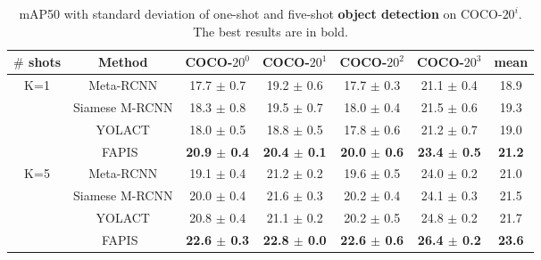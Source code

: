 \documentclass[final]{cvpr}
\def\Approach{FAPIS}
\begin{document}
\begin{table*}[]

\begin{center}
\small
\begin{tabular}{c|c|c|c|c|c|c}
\hline
\hline
\textbf{$\#$ shots} & \textbf{Method}  & \textbf{COCO-$20^0$}      & \textbf{COCO-$20^1$}      & \textbf{COCO-$20^2$ }     & \textbf{COCO-$20^3$}      & mean  \\
\hline
\multirow{4}{*}{K=1} & Meta-RCNN \cite{yanICCV19metarcnn}        & 17.7 $\pm$ 0.7 & 19.2 $\pm$ 0.6 & 17.7 $\pm$ 0.3 & 21.1 $\pm$ 0.4 & 18.9 \\
& Siamese M-RCNN \cite{michaelis2018one} & 18.3 $\pm$ 0.8 & 19.5 $\pm$ 0.7 & 18.0 $\pm$ 0.4 & 21.5 $\pm$ 0.6 & 19.3 \\
& YOLACT \cite{bolya2019yolact}  &    18.0 $\pm$ 0.5 &  18.8 $\pm$ 0.5 & 17.8 $\pm$ 0.6 & 21.2 $\pm$ 0.7 & 19.0 \\
& \Approach~ & \textbf{20.9  $\pm$ 0.4}  &  \textbf{20.4 $\pm$ 0.1} & \textbf{20.0 $\pm$ 0.6} & \textbf{23.4 $\pm$ 0.5}   &  \textbf{21.2}   \\ 

\hline

\multirow{4}{*}{K=5} & Meta-RCNN \cite{yanICCV19metarcnn}        & 19.1 $\pm$ 0.4 & 21.2 $\pm$ 0.2 & 19.6 $\pm$ 0.5 & 24.0 $\pm$ 0.2 & 21.0 \\
& Siamese M-RCNN \cite{michaelis2018one} & 20.0 $\pm$ 0.4 & 21.6 $\pm$ 0.3 & 20.2 $\pm$ 0.4 & 24.1 $\pm$ 0.3 & 21.5 \\
& YOLACT \cite{bolya2019yolact} &  20.8 $\pm$ 0.4 & 21.1 $\pm$ 0.2 & 20.2 $\pm$ 0.5 & 24.8 $\pm$ 0.2 & 21.7 \\
& \Approach~   & \textbf{22.6 $\pm$ 0.3}  &  \textbf{22.8 $\pm$ 0.0} & \textbf{22.6 $\pm$ 0.6} & \textbf{26.4 $\pm$ 0.2} & \textbf{23.6} \\

\hline 
\hline
\end{tabular}
\end{center}
\vspace{-5pt}
\caption{mAP50 with standard deviation of one-shot and five-shot {\bf object detection} on COCO-$20^i$. The best results are in bold.}
\label{tab:few_shot_det}
\end{table*}
\end{document}
